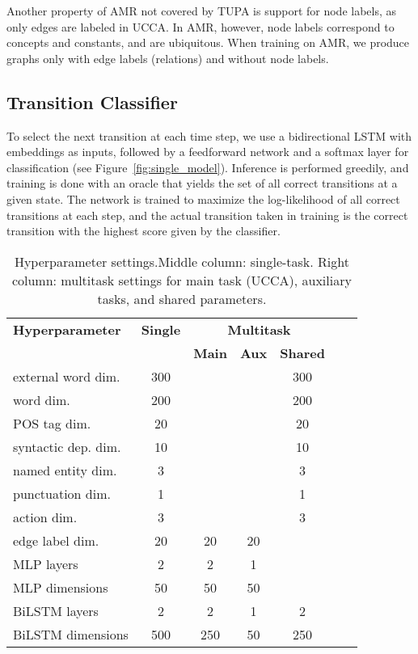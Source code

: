 \documentclass[11pt,a4paper]{article}
\begin{document}
Another property of AMR not covered by TUPA is support for node labels, 
as only edges are labeled in UCCA. In AMR, however, node labels correspond 
to concepts and constants, and are ubiquitous.
When training on AMR, we produce graphs only with edge labels (relations) 
and without node labels.


\subsection{Transition Classifier}\label{sec:classifier}

To select the next transition at each time step,
we use a bidirectional LSTM with embeddings as inputs,
followed by a feedforward network and a softmax layer for classification 
(see Figure~\ref{fig:single_model}).
Inference is performed greedily,
and training is done with an oracle that yields the set of all correct 
transitions at a given state.
The network is trained to maximize the log-likelihood of all correct transitions at
each step, and the actual transition taken in training is the correct transition
with the highest score given by the classifier.


\begin{table}
\centering
\footnotesize
\begin{tabular}{l|c|ccccc}
\bf Hyperparameter &  \bf Single & \multicolumn{3}{c}{\bf Multitask} \\ 
&& \bf Main & \bf Aux & \bf Shared \\
\hline
external word dim. & 300 &&& 300 \\
word dim. & 200 &&& 200 \\
POS tag dim. & 20 &&& 20 \\
syntactic dep. dim. & 10 &&& 10 \\
named entity dim. & 3 &&& 3 \\
punctuation dim. & 1 &&& 1 \\
action dim. & 3 &&& 3 \\
edge label dim. & 20 & 20 & 20 \\
MLP layers & 2 & 2 & 1 \\
MLP dimensions & 50 & 50 & 50 \\
BiLSTM layers & 2 & 2 & 1 & 2 \\
BiLSTM dimensions & 500 & 250 & 50 & 250
\end{tabular}
\caption{Hyperparameter settings.\label{tab:hyperparams}
Middle column: single-task.
Right column: multitask settings for main task (UCCA), auxiliary tasks, and shared parameters.}
\end{table}
\end{document}
